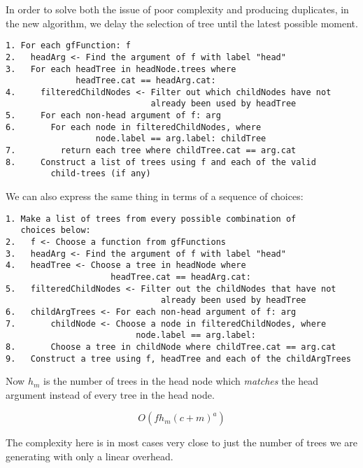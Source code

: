 In order to solve both the issue of poor complexity and producing duplicates, in the new algorithm, we delay the selection of tree until the latest possible moment.




\begin{verbatim}
1. For each gfFunction: f
2.   headArg <- Find the argument of f with label "head"
3.   For each headTree in headNode.trees where
              headTree.cat == headArg.cat:
4.     filteredChildNodes <- Filter out which childNodes have not
                             already been used by headTree
5.     For each non-head argument of f: arg
6.       For each node in filteredChildNodes, where
                  node.label == arg.label: childTree
7.         return each tree where childTree.cat == arg.cat
8.     Construct a list of trees using f and each of the valid
         child-trees (if any)
\end{verbatim}

We can also express the same thing in terms of a sequence of choices:

\begin{verbatim}
1. Make a list of trees from every possible combination of
   choices below:
2.   f <- Choose a function from gfFunctions
3.   headArg <- Find the argument of f with label "head"
4.   headTree <- Choose a tree in headNode where 
                     headTree.cat == headArg.cat:
5.   filteredChildNodes <- Filter out the childNodes that have not 
                               already been used by headTree
6.   childArgTrees <- For each non-head argument of f: arg
7.       childNode <- Choose a node in filteredChildNodes, where 
                          node.label == arg.label:
8.       Choose a tree in childNode where childTree.cat == arg.cat
9.   Construct a tree using f, headTree and each of the childArgTrees
\end{verbatim}


Now $h_m$ is the number of trees in the head node which \emph{matches} the head argument instead of every tree in the head node.

$$
O(f h_m (c+m)^a)
$$

The complexity here is in most cases very close to just the number of trees we are generating with only a linear overhead. %

